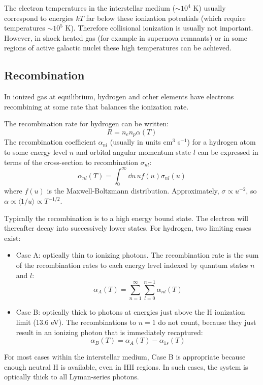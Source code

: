 The electron temperatures in the interstellar medium ($\sim 10^4$ K)
usually correspond to energies $kT$ far below these ionization
potentials (which require temperatures $\sim 10^5$ K). Therefore
collisional ionization is usually not important. However, in shock
heated gas (for example in supernova remnants) or in some regions of
active galactic nuclei these high temperatures can be achieved.

\subsection{Recombination}

In ionized gas at equilibrium, hydrogen and other elements have
electrons recombining at some rate that balances the ionization rate.

The recombination rate for hydrogen can be written:
\begin{equation}
R = n_e n_p \alpha(T)
\end{equation}
The recombination coefficient $\alpha_{nl}$ (usually in units
cm$^{3}$ s$^{-1}$) for a hydrogen atom to some energy level $n$ and
orbital angular momentum state $l$ can be expressed in terms of the
cross-section to recombination $\sigma_{nl}$:
\begin{equation}
\label{eq:alpha}
\alpha_{nl}(T) = \int_0^\infty \dd{u}\, u f(u) \sigma_{nl}(u)
\end{equation}
where $f(u)$ is the Maxwell-Boltzmann distribution. Approximately,
$\sigma \propto u^{-2}$, so $\alpha\propto \langle 1/u\rangle \propto
T^{-1/2}$.

Typically the recombination is to a high energy bound state. The
electron will thereafter decay into successively lower states. For
hydrogen, two limiting cases exist:
\begin{itemize}
\item Case A: optically thin to ionizing photons. The recombination
  rate is the sum of the recombination rates to each energy level
  indexed by quantum states $n$ and $l$:
  \begin{equation}
    \alpha_A(T) =
    \sum_{n=1}^{\infty} 
    \sum_{l=0}^{n-1} \alpha_{nl}(T)
  \end{equation}
\item Case B: optically thick to photons at energies just above the H
  ionization limit (13.6 eV). The recombinations to $n=1$ do not
  count, because they just result in an ionizing photon that is
  immediately recaptured:
  \begin{equation}
    \alpha_B(T) = \alpha_A(T) - \alpha_{1s} (T)
  \end{equation}
\end{itemize}
For most cases within the interstellar medium, Case B is appropriate
because enough neutral H is available, even in HII regions. In such
cases, the system is optically thick to all Lyman-series photons.

